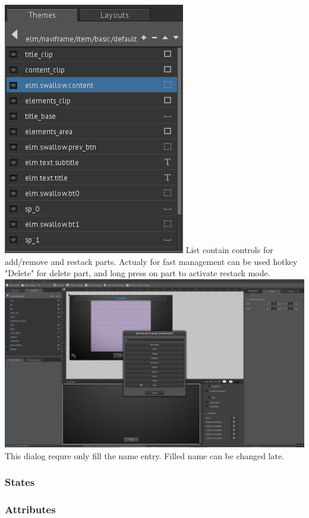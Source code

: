 \documentclass[titlepage,oneside,11pt]{book}
\begin{document}
\includegraphics[scale=0.5]{images/part_list.png}\newline
List contain controls for add/remove and restack parts. Actualy for fast management can be used hotkey "{}Delete"{} for delete part, and long press on part to activate restack mode.\newline
\includegraphics[scale=0.2]{images/part_add_dialog.jpg}\newline
This dialog requre  only fill the name entry. Filled name can be changed late.
\subsubsection{States}
\subsubsection{Attributes}
\end{document}
